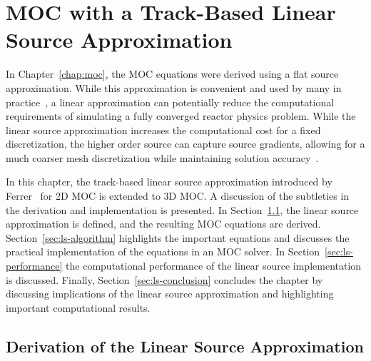 \chapter{MOC with a Track-Based Linear Source Approximation}
\label{chap:linear-source}

In Chapter~\ref{chap:moc}, the MOC equations were derived using a flat source approximation. While this approximation is convenient and used by many in practice~\cite{dragon_3d_moc, kochunas, apollo3_vv, cactus_3d, liu_mrt, mockingbird}, a linear approximation can potentially reduce the computational requirements of simulating a fully converged reactor physics problem. While the linear source approximation increases the computational cost for a fixed discretization, the higher order source can capture source gradients, allowing for a much coarser mesh discretization while maintaining solution accuracy~\cite{ferrer2012linear}. 

In this chapter, the track-based linear source approximation introduced by Ferrer~\cite{ferrer2015linear} for 2D \ac{MOC} is extended to 3D \ac{MOC}. A discussion of the subtleties in the derivation and implementation is presented. In Section~\ref{sec:ls-derivation}, the linear source approximation is defined, and the resulting \ac{MOC} equations are derived. Section~\ref{sec:ls-algorithm} highlights the important equations and discusses the practical implementation of the equations in an \ac{MOC} solver. In Section~\ref{sec:ls-performance} the computational performance of the linear source implementation is discussed. Finally, Section~\ref{sec:ls-conclusion} concludes the chapter by discussing implications of the linear source approximation and highlighting important computational results.

\section{Derivation of the Linear Source Approximation}
\label{sec:ls-derivation}

